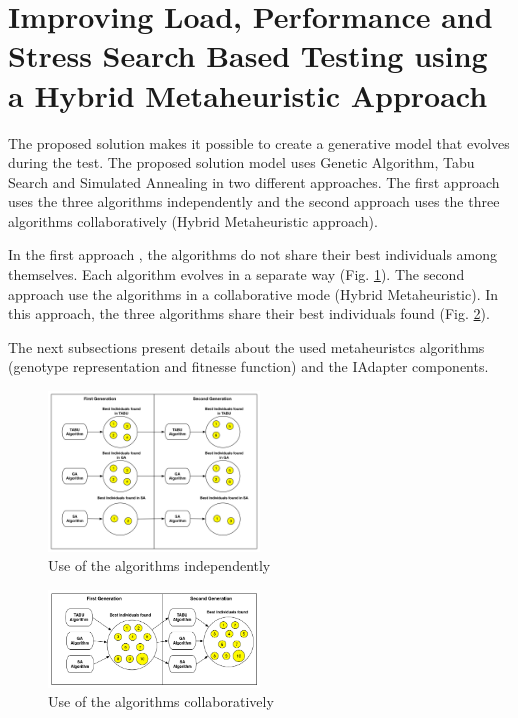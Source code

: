 \section{Improving Load, Performance and Stress Search Based Testing using a Hybrid Metaheuristic Approach}


The proposed solution makes it possible to create a generative model that evolves during the test. The proposed solution model uses Genetic Algorithm, Tabu Search and Simulated Annealing in two different approaches.  The first approach uses the three algorithms independently and the second approach uses the three algorithms collaboratively (Hybrid Metaheuristic approach).

In the first approach , the algorithms do not share their best individuals among themselves. Each algorithm evolves in a separate way (Fig. \ref{fig:firstaproach}). The second approach use the algorithms in a collaborative mode (Hybrid Metaheuristic). In this approach, the three algorithms share their best individuals found (Fig. \ref{fig:secondapproach}).

The next subsections present details about the used metaheuristcs algorithms (genotype representation and fitnesse function) and the IAdapter components.

\begin{figure}[h]
\includegraphics[width=0.5\textwidth]{./images/independ.png}
\caption{Use of the algorithms independently}
\label{fig:firstaproach}
\end{figure}
\begin{figure}
\includegraphics[width=0.5\textwidth]{./images/collaborative.png}
\caption{Use of the  algorithms collaboratively}
\label{fig:secondapproach}
\end{figure}

